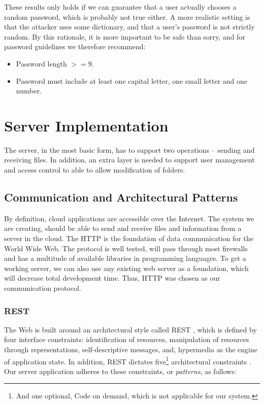 \documentclass[pdftex,english,10pt,b5paper,twoside]{book}
\begin{document}
These results only holds if we can guarantee that a user actually chooses
a random password, which is probably not true either. A more realistic setting
is that the attacker uses some dictionary, and that a user's password is not
strictly random. By this rationale, it is more important to be safe than sorry,
and for password guidelines we therefore recommend:
\begin{itemize}
\item Password length $>= 9$.
\item Password must include at least one capital letter, one small letter and
one number.
\end{itemize}

\section{Server Implementation}

The server, in the most basic form, has to support two operations -- sending
and receiving files. In addition, an extra layer is needed to support user
management and access control to able to allow modification of folders.

\subsection{Communication and Architectural Patterns}

By definition, cloud applications are accessible over the Internet. The system
we are creating, should be able to send and receive files and information from
a server in the cloud. The \acf{HTTP} is the foundation of data communication
for the World Wide Web. The protocol is well tested, will pass through most
firewalls and has a multitude of available libraries in programming languages.
To get a working server, we can also use any existing web server as a
foundation, which will decrease total development time. Thus, \ac{HTTP} was
chosen as our communication protocol.

\subsubsection{\acs{REST}} The Web is built around an architectural style called
\ac{REST} \cite[ch. 5]{fielding}, which is defined by four interface
constraints: identification of resources, manipulation of resources through
representations, self-descriptive messages, and, hypermedia as the engine of
application state. In addition, \ac{REST} dictates five\footnote{And one
optional, Code on demand, which is not applicable for our system.} architectural
constraints \cite{fielding}. Our server application adheres to these
constraints, or \emph{patterns}, as follows:
\end{document}
